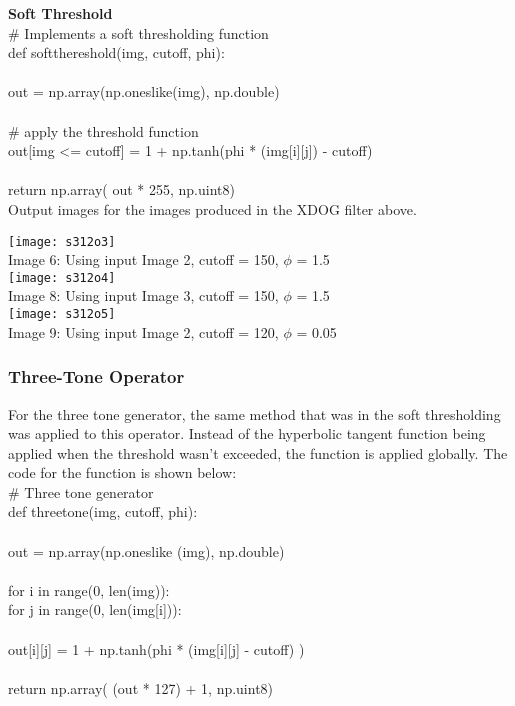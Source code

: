 \documentclass{article}
\begin{document}
	\smallskip
	
	\textbf{Soft Threshold}\\
	
	\noindent \# Implements a soft thresholding function\\
	def soft\textunderscore thereshold(img, cutoff, phi):\\
	\\
	\indent out = np.array(np.ones\textunderscore like(img), np.double)\\
	\\
	\indent \# apply the threshold function\\
	\indent out[img <= cutoff] = 1 + np.tanh(phi * (img[i][j]) - cutoff)\\
	\\
	\indent return np.array( out * 255, np.uint8)\\
	
	Output images for the images produced in the XDOG filter above.\\
	
	\begin{center}
		
		\texttt{[image: s312o3]}\\
		Image 6: Using input Image 2, cutoff = 150, $\phi$ = 1.5\\
		
		\texttt{[image: s312o4]}\\
		Image 8: Using input Image 3, cutoff = 150, $\phi$ = 1.5\\
		
		\texttt{[image: s312o5]}\\
		Image 9: Using input Image 2, cutoff = 120, $\phi$ = 0.05\\
	\end{center}
	
	\subsubsection{Three-Tone Operator}
	
	For the three tone generator, the same method that was in the soft thresholding was applied to this operator. Instead of the hyperbolic tangent function being applied when the threshold wasn't exceeded, the function is applied globally. The code for the function is shown below:\\
	
	\noindent \# Three tone generator\\
	\noindent def three\textunderscore tone(img, cutoff, phi):\\
	\\
	\indent out = np.array(np.ones\textunderscore like (img), np.double)\\
	\\
	\indent for i in range(0, len(img)):\\
	\indent \indent for j in range(0, len(img[i])):\\
	\\
	\indent \indent \indent out[i][j] = 1 + np.tanh(phi * (img[i][j] - cutoff) )\\
	\\
	\indent return np.array( (out * 127) + 1, np.uint8)\\
	
\end{document}
